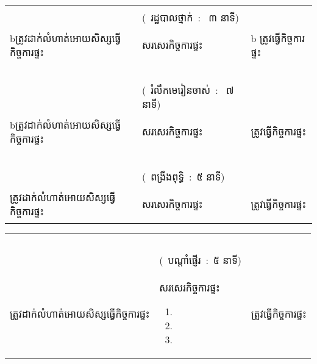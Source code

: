 \documentclass{classes/exam}
\begin{document}
\begin{tabu} to\linewidth{|X[1,l]|X[1,l]|X[1,l]|} \hline
	&  & \\ \hline
	&\vspace{-1mm}&\\
	&\vspace{-2mm}\centering (~រដ្ឋបាលថ្នាក់~: ~៣ នាទី)&\\
	bត្រូវដាក់លំហាត់អោយសិស្សធ្វើកិច្ចការផ្ទះ& សរសេរកិច្ចការផ្ទះ
\begin{center}
\end{center}
&b ត្រូវធ្វើកិច្ចការផ្ទះ\\
&​&\\
&\vspace{-2mm}\centering (~រំលឹកមេរៀនចាស់~: ~៧ នាទី)&\\
bត្រូវដាក់លំហាត់អោយសិស្សធ្វើកិច្ចការផ្ទះ& សរសេរកិច្ចការផ្ទះ
\begin{center}
\end{center}
	& ត្រូវធ្វើកិច្ចការផ្ទះ\\
	&​&\\
	&\vspace{-2mm}\centering (~ពង្រឹងពុទ្ធិ~:~៥ នាទី)&\\
	ត្រូវដាក់លំហាត់អោយសិស្សធ្វើកិច្ចការផ្ទះ& សរសេរកិច្ចការផ្ទះ
\begin{center}
\end{center}
	& ត្រូវធ្វើកិច្ចការផ្ទះ\\\hline
\end{tabu}
\newpage
\noindent
\begin{tabu} to\linewidth{|X[1,l]|X[1,l]|X[1,l]|} \hline
	&​&\\
	&\vspace{-2mm}\centering (~បណ្តាំផ្ញើរ~:~៥ នាទី)&\\
	ត្រូវដាក់លំហាត់អោយសិស្សធ្វើកិច្ចការផ្ទះ& សរសេរកិច្ចការផ្ទះ
\begin{center}
\end{center}
\begin{enumerate}
	\item
	\item
	\item
\end{enumerate}
&ត្រូវធ្វើកិច្ចការផ្ទះ\\\hline
\end{tabu}
\end{document}
